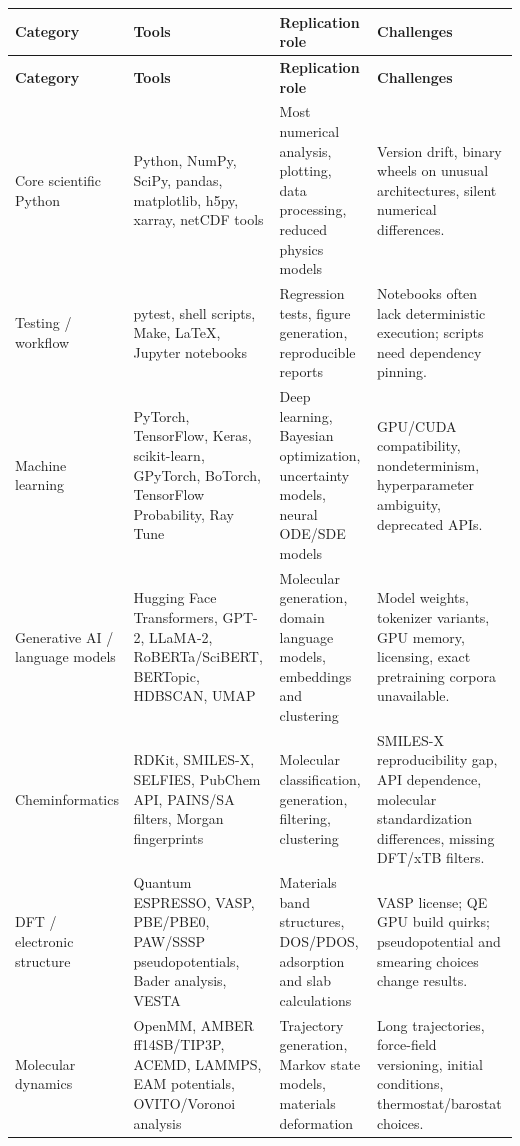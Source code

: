 \documentclass[11pt,letterpaper]{article}
\begin{document}
\begin{longtable}{p{3.2cm}p{4.2cm}p{5.1cm}p{4.0cm}}
\toprule
\textbf{Category} & \textbf{Tools} & \textbf{Replication role} & \textbf{Challenges} \\
\midrule
\endfirsthead
\toprule
\textbf{Category} & \textbf{Tools} & \textbf{Replication role} & \textbf{Challenges} \\
\midrule
\endhead
Core scientific Python & Python, NumPy, SciPy, pandas, matplotlib, h5py, xarray, netCDF tools & Most numerical analysis, plotting, data processing, reduced physics models & Version drift, binary wheels on unusual architectures, silent numerical differences. \\
\addlinespace
Testing / workflow & pytest, shell scripts, Make, LaTeX, Jupyter notebooks & Regression tests, figure generation, reproducible reports & Notebooks often lack deterministic execution; scripts need dependency pinning. \\
\addlinespace
Machine learning & PyTorch, TensorFlow, Keras, scikit-learn, GPyTorch, BoTorch, TensorFlow Probability, Ray Tune & Deep learning, Bayesian optimization, uncertainty models, neural ODE/SDE models & GPU/CUDA compatibility, nondeterminism, hyperparameter ambiguity, deprecated APIs. \\
\addlinespace
Generative AI / language models & Hugging Face Transformers, GPT-2, LLaMA-2, RoBERTa/SciBERT, BERTopic, HDBSCAN, UMAP & Molecular generation, domain language models, embeddings and clustering & Model weights, tokenizer variants, GPU memory, licensing, exact pretraining corpora unavailable. \\
\addlinespace
Cheminformatics & RDKit, SMILES-X, SELFIES, PubChem API, PAINS/SA filters, Morgan fingerprints & Molecular classification, generation, filtering, clustering & SMILES-X reproducibility gap, API dependence, molecular standardization differences, missing DFT/xTB filters. \\
\addlinespace
DFT / electronic structure & Quantum ESPRESSO, VASP, PBE/PBE0, PAW/SSSP pseudopotentials, Bader analysis, VESTA & Materials band structures, DOS/PDOS, adsorption and slab calculations & VASP license; QE GPU build quirks; pseudopotential and smearing choices change results. \\
\addlinespace
Molecular dynamics & OpenMM, AMBER ff14SB/TIP3P, ACEMD, LAMMPS, EAM potentials, OVITO/Voronoi analysis & Trajectory generation, Markov state models, materials deformation & Long trajectories, force-field versioning, initial conditions, thermostat/barostat choices. \\

\end{longtable}
\end{document}
